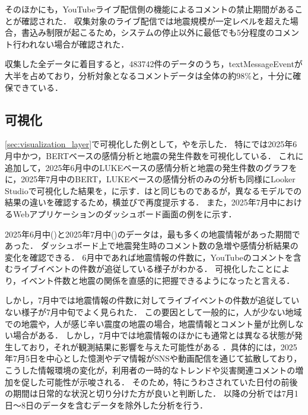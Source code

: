 そのほかにも，YouTubeライブ配信側の機能によるコメントの禁止期間があることが確認された．
収集対象のライブ配信では地震規模が一定レベルを超えた場合，書込み制限が起こるため，システムの停止以外に最低でも5分程度のコメント行われない場合が確認された．

収集した全データに着目すると，483742件のデータのうち，textMessageEventが大半を占めており，分析対象となるコメントデータは全体の約98\%と，十分に確保できている．

\subsection{可視化}
\ref{sec:visualization_layer}で可視化した例として，やを示した．
特にでは2025年6月中かつ，BERTベースの感情分析と地震の発生件数を可視化している．
これに追加して，2025年6月中のLUKEベースの感情分析と地震の発生件数のグラフをに，2025年7月中のBERT，LUKEベースの感情分析のみの分析も同様にLooker Studioで可視化した結果を，に示す．はと同じものであるが，異なるモデルでの結果の違いを確認するため，横並びで再度提示する．
また，2025年7月中におけるWebアプリケーションのダッシュボード画面の例をに示す．







\clearpage

2025年6月中()と2025年7月中()のデータは，最も多くの地震情報があった期間であった．
ダッシュボード上で地震発生時のコメント数の急増や感情分析結果の変化を確認できる．
6月中であれば地震情報の件数に，YouTubeのコメントを含むライブイベントの件数が追従している様子がわかる．
可視化したことにより，イベント件数と地震の関係を直感的に把握できるようになったと言える．

しかし，7月中では地震情報の件数に対してライブイベントの件数が追従していない様子が7月中旬でよく見られた．
この要因として一般的に，人が少ない地域での地震や，人が感じ辛い震度の地震の場合，地震情報とコメント量が比例しない場合がある．
しかし，7月中では地震情報のほかにも通常とは異なる状態が発生しており，それが観測結果に影響を与えた可能性がある
．具体的には，2025年7月5日を中心とした憶測やデマ情報がSNSや動画配信を通じて拡散しており，こうした情報環境の変化が，利用者の一時的なトレンドや災害関連コメントの増加を促した可能性が示唆される\cite{NHK2025k10014855191000}．
そのため，特にうわさされていた日付の前後の期間は日常的な状況と切り分けた方が良いと判断した．
以降の分析では7月1日〜8日のデータを含むデータを除外した分析を行う．

